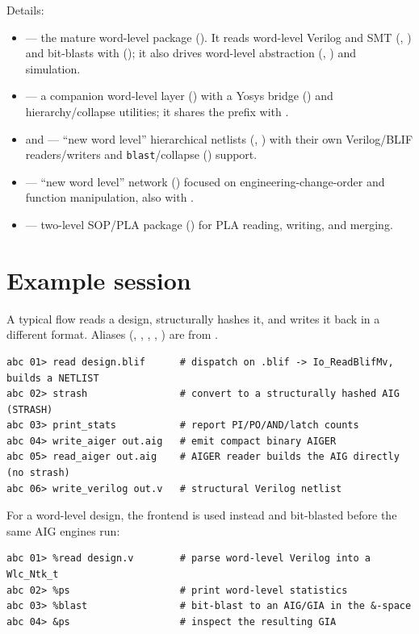 \noindent Details:
\begin{itemize}
  \item {} --- the mature word-level package (). It
        reads word-level Verilog and SMT (,
        ) and bit-blasts with 
        (); it also drives word-level abstraction
        (, ) and simulation.
  \item {} --- a companion word-level layer () with a
        Yosys bridge () and hierarchy/collapse utilities; it shares
        the \cmd{\%} prefix with .
  \item {} and  --- ``new word level'' hierarchical
        netlists (, ) with their own Verilog/BLIF
        readers/writers and \texttt{blast}/collapse () support.
  \item {} --- ``new word level'' network () focused on
        engineering-change-order and function manipulation, also with
        .
  \item {} --- two-level SOP/PLA package () for PLA
        reading, writing, and merging.
\end{itemize}

\section{Example session}

A typical flow reads a design, structurally hashes it, and writes it back in a
different format. Aliases (, , , , ) are from
.

\begin{lstlisting}[style=abcshell]
abc 01> read design.blif      # dispatch on .blif -> Io_ReadBlifMv, builds a NETLIST
abc 02> strash                # convert to a structurally hashed AIG (STRASH)
abc 03> print_stats           # report PI/PO/AND/latch counts
abc 04> write_aiger out.aig   # emit compact binary AIGER
abc 05> read_aiger out.aig    # AIGER reader builds the AIG directly (no strash)
abc 06> write_verilog out.v   # structural Verilog netlist
\end{lstlisting}

\noindent For a word-level design, the  frontend is used instead and
bit-blasted before the same AIG engines run:

\begin{lstlisting}[style=abcshell]
abc 01> %read design.v        # parse word-level Verilog into a Wlc_Ntk_t
abc 02> %ps                   # print word-level statistics
abc 03> %blast                # bit-blast to an AIG/GIA in the &-space
abc 04> &ps                   # inspect the resulting GIA
\end{lstlisting}
